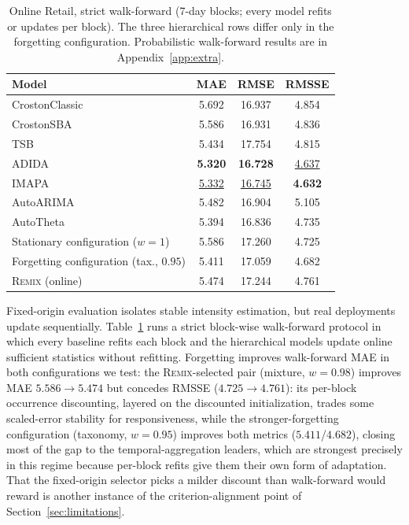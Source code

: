 \documentclass[twocolumn,10pt]{article}
\newcommand{\REMIX}{\textsc{Remix}}
\newcommand{\best}[1]{\textbf{#1}}
\newcommand{\secondbest}[1]{\underline{#1}}
\begin{document}
\begin{table}[t]
\centering
\caption{Online Retail, strict walk-forward (7-day blocks; every model
refits or updates per block). The three hierarchical rows differ only in
the forgetting configuration. Probabilistic walk-forward results are in
Appendix~\ref{app:extra}.}
\label{tab:walkforward}
\small
\setlength{\tabcolsep}{5pt}
\begin{tabular}{lccc}
\toprule
Model & MAE & RMSE & RMSSE\\
\midrule
CrostonClassic & 5.692 & 16.937 & 4.854\\
CrostonSBA & 5.586 & 16.931 & 4.836\\
TSB & 5.434 & 17.754 & 4.815\\
ADIDA & \best{5.320} & \best{16.728} & \secondbest{4.637}\\
IMAPA & \secondbest{5.332} & \secondbest{16.745} & \best{4.632}\\
AutoARIMA & 5.482 & 16.904 & 5.105\\
AutoTheta & 5.394 & 16.836 & 4.735\\
\midrule
Stationary configuration ($w{=}1$) & 5.586 & 17.260 & 4.725\\
Forgetting configuration (tax., $0.95$) & 5.411 & 17.059 & 4.682\\
\REMIX{} (online) & 5.474 & 17.244 & 4.761\\
\bottomrule
\end{tabular}
\end{table}

Fixed-origin evaluation isolates stable intensity estimation, but real
deployments update sequentially. Table~\ref{tab:walkforward} runs a
strict block-wise walk-forward protocol in which every baseline refits
each block and the hierarchical models update online sufficient
statistics without refitting. Forgetting improves walk-forward MAE in
both configurations we test: the \REMIX{}-selected pair (mixture,
$w{=}0.98$) improves MAE $5.586\!\to\!5.474$ but concedes RMSSE
($4.725\!\to\!4.761$): its per-block occurrence discounting, layered on
the discounted initialization, trades some scaled-error stability for
responsiveness, while the stronger-forgetting configuration (taxonomy,
$w{=}0.95$) improves both metrics ($5.411$/$4.682$), closing most of the
gap to the temporal-aggregation leaders, which are strongest precisely
in this regime because per-block refits give them their own form of
adaptation. That the fixed-origin selector picks a milder discount than
walk-forward would reward is another instance of the
criterion-alignment point of Section~\ref{sec:limitations}.
\end{document}
